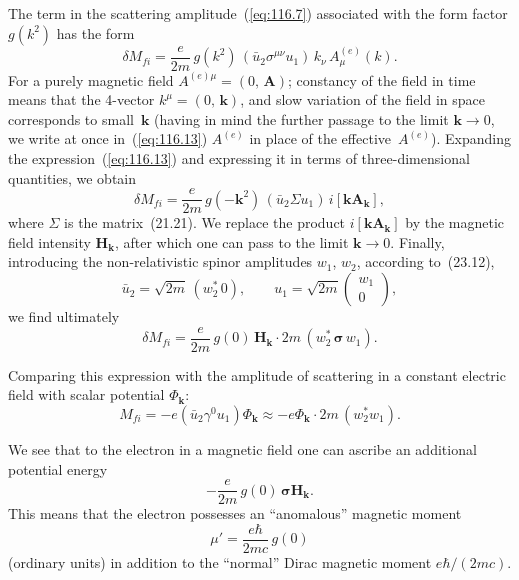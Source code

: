 The term in the scattering amplitude~(\ref{eq:116.7}) associated with the form factor $g(k^2)$ has the form
\begin{equation}
\delta M_{fi} = \frac{e}{2m}\,g(k^2)\,(\bar{u}_2\sigma^{\mu\nu}u_1)\,k_\nu\,A_\mu^{(e)}(k).
\label{eq:116.13}
\end{equation}
For a purely magnetic field $A^{(e)\mu} = (0,\,\mathbf{A})$; constancy of the field in time means that the 4-vector $k^\mu = (0,\,\mathbf{k})$, and slow variation of the field in space corresponds to small~$\mathbf{k}$ (having in mind the further passage to the limit $\mathbf{k} \to 0$, we write at once in~(\ref{eq:116.13}) $A^{(e)}$ in place of the effective~$A^{(e)}$). Expanding the expression~(\ref{eq:116.13}) and expressing it in terms of three-dimensional quantities, we obtain
\[
\delta M_{fi} = \frac{e}{2m}\,g(-\mathbf{k}^2)\,(\bar{u}_2\varSigma u_1)\,i[\mathbf{k} \mathbf{A}_\mathbf{k}],
\]
where $\varSigma$ is the matrix~(21.21). We replace the product $i[\mathbf{k}\mathbf{A}_\mathbf{k}]$ by the magnetic field intensity $\mathbf{H}_\mathbf{k}$, after which one can pass to the limit $\mathbf{k} \to 0$. Finally, introducing the non-relativistic spinor amplitudes $w_1$, $w_2$, according to~(23.12),
\[
\bar{u}_2 = \sqrt{2m}\,(w_2^*\, 0), \qquad u_1 = \sqrt{2m}\begin{pmatrix} w_1 \\ 0 \end{pmatrix},
\]
we find ultimately
\begin{equation}
\delta M_{fi} = \frac{e}{2m}\,g(0)\,\mathbf{H}_\mathbf{k}\cdot 2m\,(w_2^*\,\boldsymbol{\sigma}\,w_1).
\label{eq:116.14}
\end{equation}


Comparing this expression with the amplitude of scattering in a constant electric field with scalar potential $\Phi_\mathbf{k}$:
\[
M_{fi} = -e(\bar{u}_2\gamma^0 u_1)\Phi_\mathbf{k} \approx -e\Phi_\mathbf{k}\cdot 2m\,(w_2^* w_1).
\]

We see that to the electron in a magnetic field one can ascribe an additional potential energy
\[
-\frac{e}{2m}\,g(0)\,\boldsymbol{\sigma}\mathbf{H}_\mathbf{k}.
\]
This means that the electron possesses an ``anomalous'' magnetic moment
\begin{equation}
\mu' = \frac{e\hbar}{2mc}\,g(0)
\label{eq:116.15}
\end{equation}
(ordinary units) in addition to the ``normal'' Dirac magnetic moment $e\hbar/(2mc)$.
